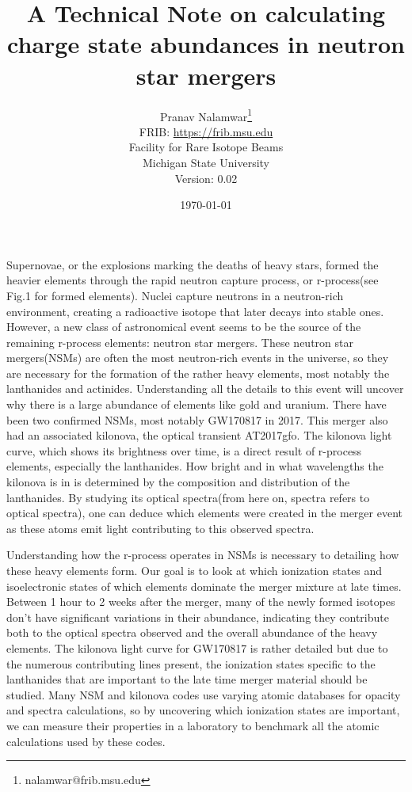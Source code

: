 \documentclass[11pt,a4paper]{article}
\begin{document}
\title{A Technical Note on calculating charge state abundances in neutron star mergers}
\author{Pranav Nalamwar\footnote{nalamwar@frib.msu.edu}\\FRIB: \url{https://frib.msu.edu}\\Facility for Rare Isotope Beams\\Michigan State University\\Version: 0.02} 
\date{\today}

\maketitle

\par 
Supernovae, or the explosions marking the deaths of heavy stars, formed the heavier elements through the rapid neutron capture process, or r-process(see Fig.1 for formed elements). Nuclei capture neutrons in a neutron-rich environment, creating a radioactive isotope that later decays into stable ones. However, a new class of astronomical event seems to be the source of the remaining r-process elements: neutron star mergers. These neutron star mergers(NSMs) are often the most neutron-rich events in the universe, so they are necessary for the formation of the rather heavy elements, most notably the lanthanides and actinides. Understanding all the details to this event will uncover why there is a large abundance of elements like gold and uranium. There have been two confirmed NSMs, most notably GW170817 in 2017. This merger also had an associated kilonova, the optical transient AT2017gfo. The kilonova light curve, which shows its brightness over time, is a direct result of r-process elements, especially the lanthanides. How bright and in what wavelengths the kilonova is in is determined by the composition and distribution of the lanthanides. By studying its optical spectra(from here on, spectra refers to optical spectra), one can deduce which elements were created in the merger event as these atoms emit light contributing to this observed spectra.\par 
Understanding how the r-process operates in NSMs is necessary to detailing how these heavy elements form. Our goal is to look at which ionization states and isoelectronic states of which elements dominate the merger mixture at late times. Between 1 hour to 2 weeks after the merger, many of the newly formed isotopes don’t have significant variations in their abundance, indicating they contribute both to the optical spectra observed and the overall abundance of the heavy elements. The kilonova light curve for GW170817 is rather detailed but due to the numerous contributing lines present, the ionization states specific to the lanthanides that are important to the late time merger material should be studied. Many NSM and kilonova codes use varying atomic databases for opacity and spectra calculations, so by uncovering which ionization states are important, we can measure their properties in a laboratory to benchmark all the atomic calculations used by these codes. 
\end{document}
